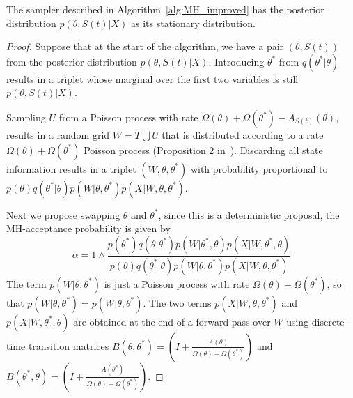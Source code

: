 \begin{proposition}
  The sampler described in Algorithm~\ref{alg:MH_improved} has the posterior
  distribution $p(\theta,S(t)|X)$ as its stationary distribution.
\end{proposition}
\begin{proof}
  Suppose that at the start of the algorithm, we have a pair $(\theta,S(t))$ from
  the posterior distribution $p(\theta,S(t)|X)$. Introducing $\theta^*$
  from $q(\theta^*|\theta)$ results in a triplet whose marginal over the first
  two variables is still $p(\theta,S(t)|X)$.

  Sampling $U$ from a Poisson process with rate $\Omega(\theta) +
  \Omega(\theta^*) - A_{S(t)}(\theta)$, results in a random grid $W = T \bigcup U$
  that is distributed according to a rate $\Omega(\theta) + \Omega(\theta^*)$
  Poisson process (Proposition 2 in~\cite{RaoTeh13}). Discarding all state 
  information results in a triplet $(W,\theta,\theta^*)$ with probability
  proportional to $p(\theta)q(\theta^*|\theta)p(W|\theta,\theta^*)
  p(X|W,\theta,\theta^*)$.

Next we propose swapping $\theta$ and $\theta^*$, since this
is a deterministic proposal, the MH-acceptance probability is given by
$$\alpha = 1 \wedge \frac{p(\theta^*)q(\theta|\theta^*)p(W|\theta^*,\theta)
p(X|W,\theta^*,\theta)}{p(\theta)q(\theta^*|\theta)p(W|\theta,\theta^*)
p(X|W,\theta,\theta^*)}$$
The term $p(W|\theta,\theta^*)$ is just a Poisson process with rate $\Omega(\theta)+
\Omega(\theta^*)$, so that $p(W|\theta,\theta^*) = p(W|\theta,\theta^*)$. The
two terms $p(X|W,\theta,\theta^*)$ and $p(X|W,\theta^*,\theta)$ are obtained
at the end of a forward pass over $W$ using discrete-time transition matrices
$B(\theta,\theta^*) = \left(I + \frac{A(\theta)}{\Omega(\theta)+\Omega(\theta^*)}\right)$ 
and $B(\theta^*,\theta) = \left(I + \frac{A(\theta^*)}{\Omega(\theta)+\Omega(\theta^*)}\right)$. 


\end{proof}
